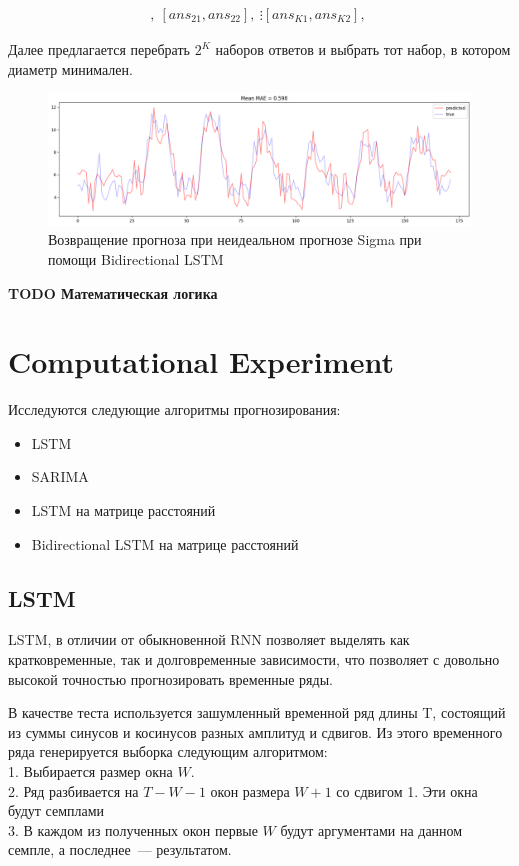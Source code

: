 \documentclass{article}
\begin{document}
\begin{gather*}
	[ans_{11}, ans_{12}],\
	[ans_{21}, ans_{22}],\
	\vdots
	[ans_{K1}, ans_{K2}],\
\end{gather*}

Далее предлагается перебрать $2^K$ наборов ответов и выбрать тот набор, в котором диаметр минимален.

\begin{figure}
	\centering
	\includegraphics[width=\textwidth]{TbiLSTM.png}
	\caption{Возвращение прогноза при неидеальном прогнозе Sigma при помощи Bidirectional LSTM}
	\label{fig:fig4}
\end{figure}

\textbf{TODO Математическая логика}

\section{Computational Experiment}

Исследуются следующие алгоритмы прогнозирования:

\begin{itemize}
	\item LSTM \cite{LSTM}
	\item SARIMA \cite{ARIMAvsLSTM}
	\item LSTM на матрице расстояний
	\item Bidirectional LSTM на матрице расстояний
\end{itemize}

\subsection{LSTM}

LSTM, в отличии от обыкновенной RNN позволяет выделять как кратковременные, так и долговременные зависимости, что позволяет с довольно высокой точностью прогнозировать временные ряды.

В качестве теста используется зашумленный временной ряд длины T, состоящий из суммы синусов и косинусов разных амплитуд и сдвигов. Из этого временного ряда генерируется выборка следующим алгоритмом:\\
1. Выбирается размер окна $W$.\\
2. Ряд разбивается на $T-W-1$ окон размера $W+1$ со сдвигом 1. Эти окна будут семплами\\
3. В каждом из полученных окон первые $W$ будут аргументами на данном семпле, а последнее~--- результатом.
\end{document}
